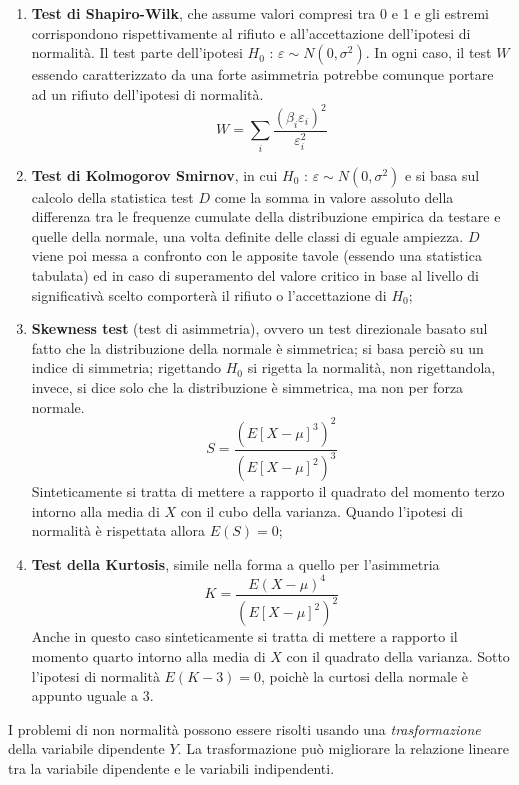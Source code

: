 \documentclass[a4page, 11pt]{article} %
\begin{document}
\begin{enumerate}
\item \textbf{Test di Shapiro-Wilk}, che assume valori compresi tra 0 e 1 e gli estremi corrispondono rispettivamente al rifiuto e all’accettazione dell’ipotesi di normalità. Il test parte dell'ipotesi $H_0$ : $\varepsilon\sim N(0,\sigma^2)$. In ogni caso, il test $W$ essendo caratterizzato da una forte asimmetria  potrebbe comunque portare ad un rifiuto dell'ipotesi di normalità.
\begin{equation*}
W = \sum_{i}\frac{(\beta_i \varepsilon_i)^2}{ 			\varepsilon_i^2}
\end{equation*}
\item \textbf{Test di Kolmogorov Smirnov}, in cui $H_0$ : $\varepsilon\sim N(0,\sigma^2)$ e si basa sul calcolo della statistica test $D$ come la somma in valore assoluto della differenza tra le frequenze cumulate della distribuzione empirica da testare e quelle della normale, una volta definite delle classi di eguale ampiezza. $D$ viene poi messa a confronto con le apposite tavole (essendo una statistica tabulata) ed in caso di superamento del valore critico in base al livello di significativà scelto comporterà il rifiuto o l'accettazione di $H_0$;
\item \textbf{Skewness test} (test di asimmetria), ovvero un test direzionale basato sul fatto che la distribuzione della normale è simmetrica; si basa perciò su un indice di simmetria; rigettando $H_0$ si rigetta la normalità, non rigettandola, invece, si dice solo che la distribuzione è simmetrica, ma non per forza normale.
\begin{equation*}
S = \frac{(E[X-\mu]^3)^2}{(E[X-\mu]^2)^3}
\end{equation*}
Sinteticamente si tratta di mettere a rapporto il quadrato del momento terzo intorno alla media di $X$ con il cubo della varianza.
\newline
Quando l'ipotesi di normalità è rispettata allora $E(S) = 0$;
\item \textbf{Test della Kurtosis}, simile nella forma a quello per l'asimmetria
\begin{equation*}
K = \frac{E(X-\mu)^4}{(E[X-\mu]^2)^2}
\end{equation*}
Anche in questo caso sinteticamente si tratta di mettere a rapporto il momento quarto intorno alla media di $X$ con il quadrato della varianza.
\newline
Sotto l'ipotesi di normalità $E(K-3) = 0$, poichè la curtosi della normale è appunto uguale a 3.
\end{enumerate}
I problemi di non normalità possono essere risolti usando una \textit{trasformazione} della variabile dipendente $Y$. La trasformazione può migliorare la relazione lineare tra la variabile dipendente e le variabili indipendenti.
\end{document}
